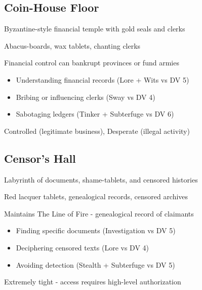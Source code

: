 \documentclass[11pt]{article}
\newenvironment{location}[1]{\begin{description}[leftmargin=*,style=standard]\item[\textbf{#1}]}{\end{description}}
\begin{document}
\subsection{Coin-House Floor}
\begin{location}{Coin-House Floor}
\item[Description:] Byzantine-style financial temple with gold seals and clerks
\item[Features:] Abacus-boards, wax tablets, chanting clerks
\item[Power:] Financial control can bankrupt provinces or fund armies
\item[Challenges:] 
  \begin{itemize}
    \item Understanding financial records (Lore + Wits vs DV 5)
    \item Bribing or influencing clerks (Sway vs DV 4)
    \item Sabotaging ledgers (Tinker + Subterfuge vs DV 6)
  \end{itemize}
\item[Position:] Controlled (legitimate business), Desperate (illegal activity)
\end{location}

\subsection{Censor's Hall}
\begin{location}{Censor's Hall}
\item[Description:] Labyrinth of documents, shame-tablets, and censored histories
\item[Features:] Red lacquer tablets, genealogical records, censored archives
\item[Significance:] Maintains The Line of Fire - genealogical record of claimants
\item[Challenges:] 
  \begin{itemize}
    \item Finding specific documents (Investigation vs DV 5)
    \item Deciphering censored texts (Lore vs DV 4)
    \item Avoiding detection (Stealth + Subterfuge vs DV 5)
  \end{itemize}
\item[Security:] Extremely tight - access requires high-level authorization
\end{location}
\end{document}
